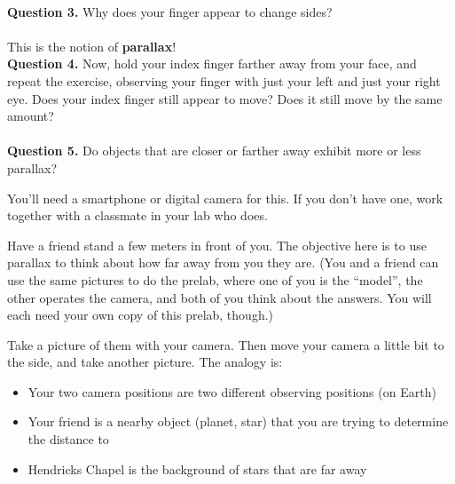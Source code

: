 \documentclass[11pt]{article}
\begin{document}
\vspace*{1.5cm}
\hrulefill\\

\textbf{Question 3.} Why does your finger appear to change sides?\\

\vspace*{1.5cm}
\hrulefill\\
This is the notion of \textbf{parallax}! \\

\textbf{Question 4.} Now, hold your index finger farther away from your face, and repeat the exercise, observing your finger with just your left and just your right eye. Does your index finger still appear to move? Does it still move by the same amount?\\

\vspace*{1.5cm}
\hrulefill\\

\textbf{Question 5.} Do objects that are closer or farther away exhibit more or less parallax?\\

\vspace*{1.5cm}
\hrulefill

\newpage

You'll need a smartphone or digital camera for this. If you don't have one, work together with a classmate in your lab who does. 

Have a friend stand a few meters in front of you. The objective here is to use parallax to think about how far away from you they are. (You and a friend can use the same pictures to do the prelab, where one of you is the ``model'', the other operates the camera, and both of you think about the answers. You will each need your own copy of this prelab, though.)

Take a picture of them with your camera. Then move your camera a little bit to the side, and take another picture. The analogy is:

\begin{itemize}
	\item Your two camera positions are two different observing positions (on Earth)
	\item Your friend is a nearby object (planet, star) that you are trying to determine the distance to
	\item Hendricks Chapel is the background of stars that are far away
	\end{itemize}
\end{document}
